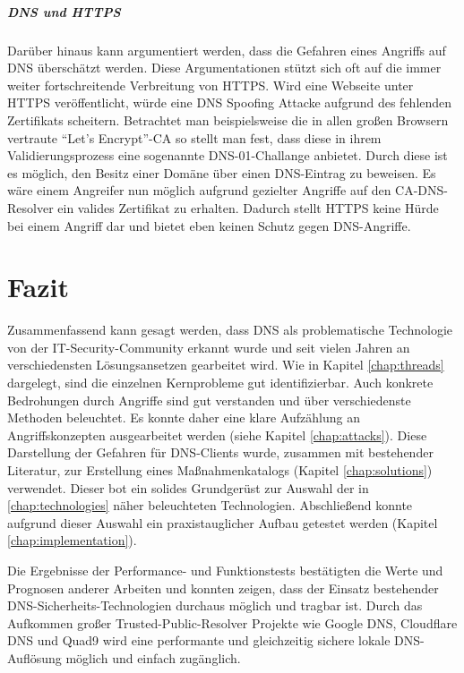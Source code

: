 \paragraph{DNS und HTTPS}
Darüber hinaus kann argumentiert werden, dass die Gefahren eines Angriffs auf DNS überschätzt werden. Diese Argumentationen stützt sich oft auf die immer weiter fortschreitende Verbreitung von HTTPS. Wird eine Webseite unter HTTPS veröffentlicht, würde eine DNS Spoofing Attacke aufgrund des fehlenden Zertifikats scheitern. Betrachtet man beispielsweise die in allen großen Browsern vertraute ``Let's Encrypt''-CA so stellt man fest, dass diese in ihrem Validierungsprozess eine sogenannte DNS-01-Challange anbietet. Durch diese ist es möglich, den Besitz einer Domäne über einen DNS-Eintrag zu beweisen. Es wäre einem Angreifer nun möglich aufgrund gezielter Angriffe auf den CA-DNS-Resolver ein valides Zertifikat zu erhalten. Dadurch stellt HTTPS keine Hürde bei einem Angriff dar und bietet eben keinen Schutz gegen DNS-Angriffe.

\chapter{Fazit}
\label{chap:conclusion}
Zusammenfassend kann gesagt werden, dass DNS als problematische Technologie von der IT-Security-Community erkannt wurde und seit vielen Jahren an verschiedensten Lösungsansetzen gearbeitet wird. Wie in Kapitel \ref{chap:threads} dargelegt, sind die einzelnen Kernprobleme gut identifizierbar. Auch konkrete Bedrohungen durch Angriffe sind gut verstanden und über verschiedenste Methoden beleuchtet. Es konnte daher eine klare Aufzählung an Angriffskonzepten ausgearbeitet werden (siehe Kapitel \ref{chap:attacks}). Diese Darstellung der Gefahren für DNS-Clients wurde, zusammen mit bestehender Literatur, zur Erstellung eines Maßnahmenkatalogs (Kapitel \ref{chap:solutions}) verwendet. Dieser bot ein solides Grundgerüst zur Auswahl der in \ref{chap:technologies} näher beleuchteten Technologien. Abschließend konnte aufgrund dieser Auswahl ein praxistauglicher Aufbau getestet werden (Kapitel \ref{chap:implementation}). 

Die Ergebnisse der Performance- und Funktionstests bestätigten die Werte und Prognosen anderer Arbeiten und konnten zeigen, dass der Einsatz bestehender DNS-Sicherheits-Technologien durchaus möglich und tragbar ist. Durch das Aufkommen großer Trusted-Public-Resolver Projekte wie Google DNS, Cloudflare DNS und Quad9 wird eine performante und gleichzeitig sichere lokale DNS-Auflösung möglich und einfach zugänglich. 

